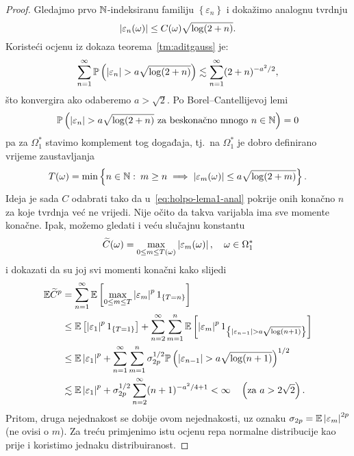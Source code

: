 \documentclass[main.tex]{subfiles}
\begin{document}
\begin{proof}
	Gledajmo prvo \( \mathbb{N} \)-indeksiranu familiju \( \left\{ \varepsilon_n \right\} \)
	i dokažimo analognu tvrdnju
	\begin{equation}\label{eq:holpo-lema1-anal}
		\left| {\varepsilon_n(\omega)} \right| \le C(\omega) \sqrt{\log(2+n)}.
	\end{equation}
	Koristeći ocjenu iz dokaza teorema~\ref{tm:aditgauss} je:
	\begin{equation}
		\sum_{n=1}^\infty \mathbb{P}\left(\left| {\varepsilon_n} \right| > a\sqrt{\log(2+n)}\right) \lesssim
		\sum_{n=1}^\infty (2+n)^{-a^2/2},
	\end{equation}
	što konvergira ako odaberemo \( a > \sqrt 2 \). Po Borel--Cantellijevoj lemi
	\begin{equation}
		\mathbb{P}\left(\left| {\varepsilon_n} \right| > a\sqrt{\log(2+n)} \text{\ za beskonačno mnogo } n \in \mathbb{N} \right) = 0
	\end{equation}
	pa za \( \Omega_1^* \) stavimo komplement tog događaja, tj.\ na \( \Omega_1^* \)
	je dobro definirano vrijeme zaustavljanja
	\begin{equation}
		T(\omega) = \min \left\{ n \in \mathbb{N} \, \colon \, m \ge n \implies
		\left| {\varepsilon_m(\omega)} \right| \le a \sqrt{\log(2+m)}  \right\}.
	\end{equation}
	Ideja je sada \( C \) odabrati tako da u~\eqref{eq:holpo-lema1-anal} pokrije
	onih konačno \( n \) za koje tvrdnja već ne vrijedi. Nije očito da takva varijabla
	ima sve momente konačne. Ipak, možemo gledati i veću slučajnu konstantu
	\begin{equation}
		\widetilde C(\omega) = \max\limits_{0 \le m \le T(\omega)} \left| {\varepsilon_m(\omega)} \right|,
		\quad \omega \in \Omega_1^*
	\end{equation}
	i dokazati da su joj svi momenti konačni kako slijedi
	\begin{align}
		\mathbb{E} \widetilde C^p & =
		\sum_{n=1}^\infty \mathbb{E} \left[ \max\limits_{0 \le m \le T} \left| {\varepsilon_m} \right|^p 1_{\left\{ T=n \right\}} \right]                                                  \\
		                  & \le \mathbb{E} \left[ \left| {\varepsilon_1} \right|^p 1_{\left\{T=1\right\}}  \right]
		+ \sum_{n=2}^\infty \sum_{m=1}^n \mathbb{E}\left[ \left| {\varepsilon_m} \right|^p 1_{\left\{ \left| {\varepsilon_{n-1}} \right| > a\sqrt{\log(n+1)} \right\} } \right]                       \\
		                  & \le \mathbb{E} \left| {\varepsilon_1} \right|^p + \sum_{n=1}^\infty \sum_{m=1}^n
		\sigma_{2p}^{1/2} \mathbb{P} \left( \left| {\varepsilon_{n-1}} \right| > a\sqrt{\log(n+1)} \right)^{1/2}                                                                           \\
		                  & \lesssim \mathbb{E} \left| {\varepsilon_1} \right|^p + \sigma_{2p}^{1/2}\sum_{n=2}^\infty (n+1)^{-a^2/4+1} < \infty \quad \left(\text{za } a > 2\sqrt2\right).
	\end{align}
	Pritom, druga nejednakost se dobije \holder ovom nejednakosti, uz oznaku
	\( \sigma_{2p} = \mathbb{E} \left| {\varepsilon_m} \right|^{2p} \) (ne ovisi o \( m \)).
	Za treću primjenimo istu ocjenu repa normalne distribucije kao prije i koristimo
	jednaku distribuiranost.


\end{proof}
\end{document}
